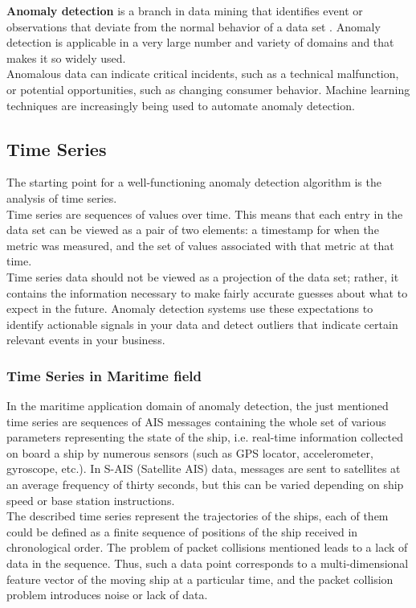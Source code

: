     \textbf{Anomaly detection} is a branch in data mining that identifies event or observations that deviate from the normal behavior of a data set \cite{anomaly_detection}. Anomaly detection is applicable in a very large number and variety of domains and that makes it so widely used.
    \\
    Anomalous data can indicate critical incidents, such as a technical malfunction, or potential opportunities, such as changing consumer behavior. Machine learning techniques are increasingly being used to automate anomaly detection.
    
    \subsection{Time Series}
    The starting point for a well-functioning anomaly detection algorithm is the analysis of time series.
    \\
    Time series are sequences of values over time. This means that each entry in the data set can be viewed as a pair of two elements: a timestamp for when the metric was measured, and the set of values associated with that metric at that time. 
    \\ 
    Time series data should not be viewed as a projection of the data set; rather, it contains the information necessary to make fairly accurate guesses about what to expect in the future. Anomaly detection systems use these expectations to identify actionable signals in your data and detect outliers that indicate certain relevant events in your business.
    
    \subsubsection{Time Series in Maritime field}
    In the maritime application domain of anomaly detection, the just mentioned time series are sequences of AIS messages containing the whole set of various parameters representing the state of the ship, i.e. real-time information collected on board a ship by numerous sensors (such as GPS locator, accelerometer, gyroscope, etc.). 
    In S-AIS (Satellite AIS) data, messages are sent to satellites at an average frequency of thirty seconds, but this can be varied depending on ship speed or base station instructions. 
    \\
    The described time series represent the trajectories of the ships, each of them could be defined as a finite sequence of positions of the ship received in chronological order. The problem of packet collisions mentioned leads to a lack of data in the sequence. Thus, such a data point corresponds to a multi-dimensional feature vector of the moving ship at a particular time, and the packet collision problem introduces noise or lack of data.

